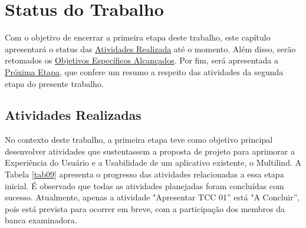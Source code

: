 \chapter[Status do Trabalho]{Status do Trabalho}
\label{chap:Status}
Com o objetivo de encerrar a primeira etapa deste trabalho, este capítulo apresentará o status das \hyperref[sec:Atividades Realizadas]{Atividades
Realizada} até o momento. Além disso, serão retomados os \hyperref[sec:Objetivos Especificos Alcancados]{Objetivos Específicos Alcançados}. 
Por fim, será apresentada a \hyperref[sec:Proxima Etapa]{Próxima Etapa}, que confere um resumo a respeito das atividades da segunda etapa do presente trabalho.

\section{Atividades Realizadas}
\label{sec:Atividades Realizadas}
No contexto deste trabalho, a primeira etapa teve como objetivo principal desenvolver atividades que sustentassem a proposta 
de projeto para aprimorar a Experiência do Usuário e a Usabilidade de um aplicativo existente, o Multilind. A Tabela \ref{tab09} apresenta 
o progresso das atividades relacionadas a essa etapa inicial. É observado que todas as atividades planejadas foram concluídas com sucesso. 
Atualmente, apenas a atividade "Apresentar TCC 01'' está "A Concluir'', pois está prevista para ocorrer em breve, com a participação dos membros da banca 
examinadora.

